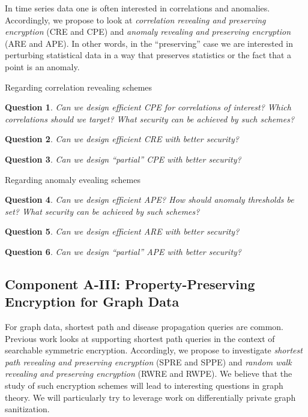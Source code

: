 \documentclass[11pt]{article}
\newtheorem{question}{Question}[section]
\theoremstyle{remark}
\begin{document}
In time series data one is often interested in correlations and anomalies.  Accordingly, we propose to look at \emph{correlation revealing and preserving encryption}  (CRE and CPE) and \emph{anomaly revealing and preserving encryption} (ARE and APE).  In other words, in the ``preserving'' case we are interested in perturbing statistical data in a way that preserves statistics or the fact that a point is an anomaly.  

Regarding correlation revealing schemes
\begin{question}
Can we design efficient CPE for correlations of interest?  Which correlations should we target?  What security can be achieved by such schemes?
\end{question}


\begin{question}
Can we design efficient CRE with better security?
\end{question}

\begin{question}
Can we design ``partial'' CPE with better security?
\end{question}


Regarding anomaly  evealing schemes
\begin{question}
Can we design efficient APE?  How should anomaly thresholds be set?  What security can be achieved by such schemes?
\end{question}


\begin{question}
Can we design efficient ARE with better security?
\end{question}

\begin{question}
Can we design ``partial'' APE with better security?
\end{question}

\subsection{Component A-III:  Property-Preserving Encryption for Graph Data} 

For graph data, shortest path and disease propagation queries are common.  Previous work looks at supporting shortest path queries in the context of searchable symmetric encryption.  Accordingly, we propose to investigate \emph{shortest path revealing  and preserving encryption} (SPRE and SPPE) and \emph{random walk revealing and preserving encryption} (RWRE and RWPE).   We believe that the study of such encryption schemes will lead to interesting questions in graph theory.  We will particularly try to leverage work on differentially private graph sanitization. 
\end{document}
